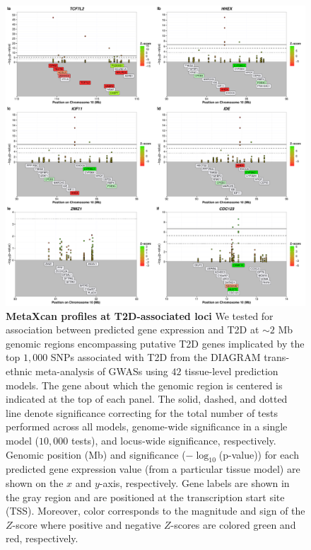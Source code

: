\documentclass[10pt]{article}
\begin{document}
\begin{figure}
\ContinuedFloat
\includegraphics[width=\textwidth]{sup_fig1_part9_locusArray.pdf}
	\caption{\textbf{MetaXcan profiles at T2D-associated loci} We tested for association between predicted gene expression and T2D at $\sim2$ Mb genomic regions encompassing putative T2D genes implicated by the top $1,000$ SNPs associated with T2D from the DIAGRAM trans-ethnic meta-analysis of GWASs using $42$ tissue-level prediction models. The gene about which the genomic region is centered is indicated at the top of each panel. The solid, dashed, and dotted line denote significance correcting for the total number of tests performed across all models, genome-wide significance in a single model ($10,000$ tests), and locus-wide significance, respectively. Genomic position (Mb) and significance ($-\log_{10}$(p-value)) for each predicted gene expression value (from a particular tissue model) are shown on the $x$ and $y$-axis, respectively. Gene labels are shown in the gray region and are positioned at the transcription start site (TSS). Moreover, color corresponds to the magnitude and sign of the $Z$-score where positive and negative $Z$-scores are colored green and red, respectively.} 
    \label{fig:supp.locus_array_fig1_part9}
\end{figure}
\end{document}
